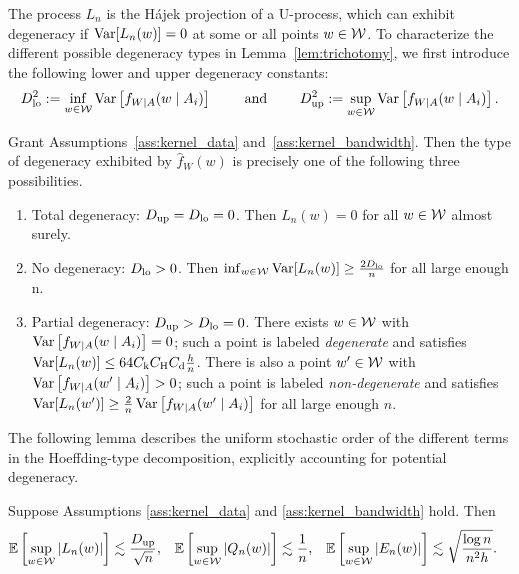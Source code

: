 The process $L_n$ is the H{\'a}jek projection of a U-process,
which can exhibit degeneracy if $\operatorname{Var}[L_n(w)] = 0$ at some
or all points $w \in \mathcal{W}$. To characterize the different possible
degeneracy types in Lemma~\ref{lem:trichotomy},
we first introduce the following lower and upper degeneracy constants:
%
\begin{align*}
  D_{\textup{lo}}^2 := \inf_{w \in \mathcal{W}} \operatorname{Var}\left[f_{W \mid A}(w \mid A_i)\right]
  \qquad \text{ and } \qquad
  D_{\textup{up}}^2 := \sup_{w \in \mathcal{W}} \operatorname{Var}\left[f_{W \mid A}(w \mid A_i)\right].
\end{align*}
%
\begin{lemma}%
  \label{lem:trichotomy}%
  Grant Assumptions~\ref{ass:kernel_data} and~\ref{ass:kernel_bandwidth}.
  Then the type of degeneracy exhibited by $\hat f_W(w)$
  is precisely one of the following three possibilities.
  \begin{enumerate}[label=(\roman*)]

    \item Total degeneracy:
      $D_{\textup{up}} = D_{\textup{lo}} = 0$. Then $L_n(w) = 0$ for all $w \in \mathcal{W}$ almost surely.

    \item No degeneracy:
      $D_{\textup{lo}} > 0$. Then $\inf_{w \in \mathcal{W}} \operatorname{Var}[L_n(w)] \geq \frac{2 D_{\textup{lo}}}{n}$
      for all large enough n.

    \item Partial degeneracy:
      $D_{\textup{up}} > D_{\textup{lo}} = 0$. There exists $w \in \mathcal{W}$ with
      $\operatorname{Var}\left[f_{W \mid A}(w \mid A_i)\right] = 0$;
      such a point is labeled \emph{degenerate} and satisfies
      $\operatorname{Var}[L_n(w)] \leq 64 C_{\mathrm{k}} C_{\mathrm{H}} C_{\mathrm{d}} \frac{h}{n}$.
      There is also a point $w' \in \mathcal{W}$ with
      $\operatorname{Var}\left[f_{W \mid A}(w' \mid A_i)\right] > 0$;
      such a point is labeled \emph{non-degenerate} and satisfies
      $\operatorname{Var}[L_n(w')] \geq
      \frac{2}{n} \operatorname{Var}\left[f_{W \mid A}(w' \mid A_i)\right]$
      for all large enough $n$.

  \end{enumerate}

\end{lemma}

The following lemma describes the uniform stochastic order of the different
terms in the Hoeffding-type decomposition, explicitly accounting for potential
degeneracy.

\begin{lemma}
  \label{lem:uniform_concentration}

  Suppose Assumptions \ref{ass:kernel_data} and
  \ref{ass:kernel_bandwidth} hold. Then
  \begin{align*}
    \mathbb{E}\left[ \sup_{w \in \mathcal{W}} |L_n(w)| \right]
    &\lesssim \frac{D_{\textup{up}}}{\sqrt n},
    &\mathbb{E}\left[ \sup_{w \in \mathcal{W}} |Q_n(w)| \right]
    &\lesssim \frac{1}{n},
    &\mathbb{E}\left[ \sup_{w \in \mathcal{W}} |E_n(w)| \right]
    &\lesssim \sqrt{\frac{\log n}{n^2h}}.
  \end{align*}
\end{lemma}


